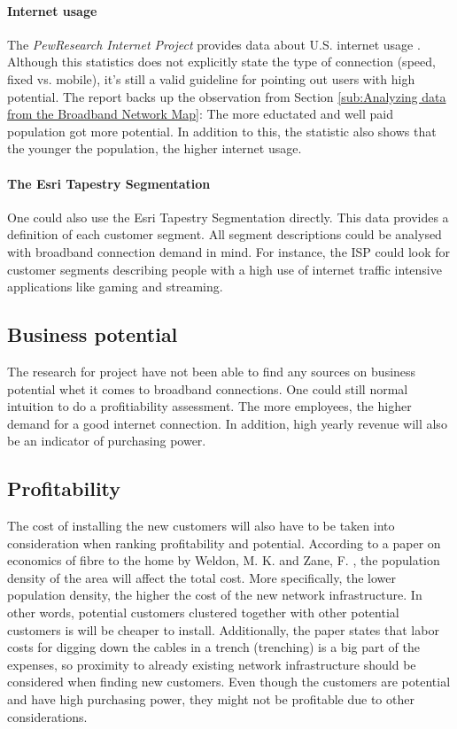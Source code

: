 \documentclass[twocolumn]{article}
\begin{document}
\paragraph{Internet usage}
\label{sub:Internet usage}
The \textit{PewResearch Internet Project} provides data about U.S. internet usage \cite{noauthor_2013-ev}. Although this statistics does not explicitly state the type of connection (speed, fixed vs. mobile), it's still a valid guideline for pointing out users with high potential. The report backs up the observation from Section \ref{sub:Analyzing data from the Broadband Network Map}: The more eductated and well paid population got more potential. In addition to this, the statistic also shows that the younger the population, the higher internet usage.

\paragraph{The Esri Tapestry Segmentation}
\label{sub:The Esri Tapestry Segmentation}
One could also use the Esri Tapestry Segmentation directly. This data provides a definition of each customer segment. All segment descriptions could be analysed with broadband connection demand in mind. For instance, the ISP could look for customer segments describing people with a high use of internet traffic intensive applications like gaming and streaming.

\subsection{Business potential}
\label{sub:Businesses}
The research for project have not been able to find any sources on business potential whet it comes to broadband connections. One could still normal intuition to do a profitiability assessment. The more employees, the higher demand for a good internet connection. In addition, high yearly revenue will also be an indicator of purchasing power.

\subsection{Profitability}
\label{sub:Profitability}
The cost of installing the new customers will also have to be taken into consideration when ranking profitability and potential. According to a paper on economics of fibre to the home by Weldon, M. K. and Zane, F. \cite{Weldon2003-xq}, the population density of the area will affect the total cost. More specifically, the lower population density, the higher the cost of the new network infrastructure. In other words, potential customers clustered together with other potential customers is will be cheaper to install. Additionally, the paper states that labor costs for digging down the cables in a trench (trenching) is a big part of the expenses, so proximity to already existing network infrastructure should be considered when finding new customers.
Even though the customers are potential and have high purchasing power, they might not be profitable due to other considerations.
\end{document}
